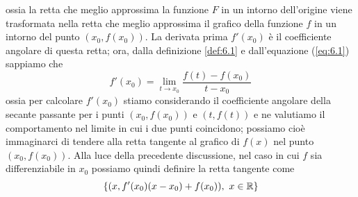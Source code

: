 ossia la retta che meglio approssima la funzione $F$ in un intorno dell'origine viene trasformata nella retta che meglio approssima il grafico della funzione $f$ in un intorno del punto $(x_0, f(x_0))$. La derivata prima $f'(x_0)$ è il coefficiente angolare di questa retta; ora, dalla definizione \ref{def:6.1} e dall'equazione (\ref{eq:6.1}) sappiamo che
\[
f'(x_0) = \lim_{t\to x_0} \frac{f(t)-f(x_0)}{t-x_0}
\]
ossia per calcolare $f'(x_0)$ stiamo considerando il coefficiente angolare della secante passante per i punti $(x_0, f(x_0))$ e $(t, f(t))$ e ne valutiamo il comportamento nel limite in cui i due punti coincidono; possiamo cioè immaginarci di tendere alla retta tangente al grafico di $f(x)$ nel punto $(x_0, f(x_0))$. Alla luce della precedente discussione, nel caso in cui $f$ sia differenziabile in $x_0$ possiamo quindi definire la retta tangente come 
\[
\{(x, f'(x_0)(x-x_0)+f(x_0)), \ x\in\amsbb{R}\}
\]
